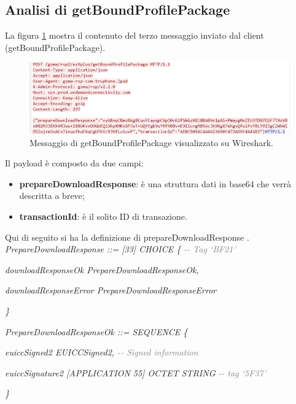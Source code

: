 \documentclass[10pt, oneside]{book}
\begin{document}
\subsection{Analisi di getBoundProfilePackage}
La figura \ref{fig:msg5-stream-pcap} mostra il contenuto del terzo messaggio inviato dal client (getBoundProfilePackage).\\
\begin{figure}
\includegraphics[width=\linewidth]{msg5-stream-pcap.png}
\caption{Messaggio di getBoundProfilePackage visualizzato su Wireshark.}
\label{fig:msg5-stream-pcap}
\end{figure}
Il payload è composto da due campi:
\begin{itemize}
\item \textbf{prepareDownloadResponse}: è una struttura dati in base64 che verrà descritta a breve;
\item \textbf{transactionId}: è il solito ID di transazione.
\end{itemize}
Qui di seguito si ha la definizione di prepareDownloadResponse \cite{RSP-definitions}.\\

\textit{PrepareDownloadResponse ::= [33] CHOICE \{ \textcolor{gray}{{-}{-} Tag `BF21'}}

\hspace{0.75cm} \textit{downloadResponseOk PrepareDownloadResponseOk,}

\hspace{0.75cm} \textit{downloadResponseError PrepareDownloadResponseError}

\textit{\}\\}

\textit{PrepareDownloadResponseOk ::= SEQUENCE \{}

\hspace{0.75cm} \textit{euiccSigned2 EUICCSigned2, \textcolor{gray}{{-}{-} Signed information}}

\hspace{0.75cm} \textit{euiccSignature2 [APPLICATION 55] OCTET STRING \textcolor{gray}{{-}{-} tag `5F37'}}

\textit{\}\\}
\end{document}
